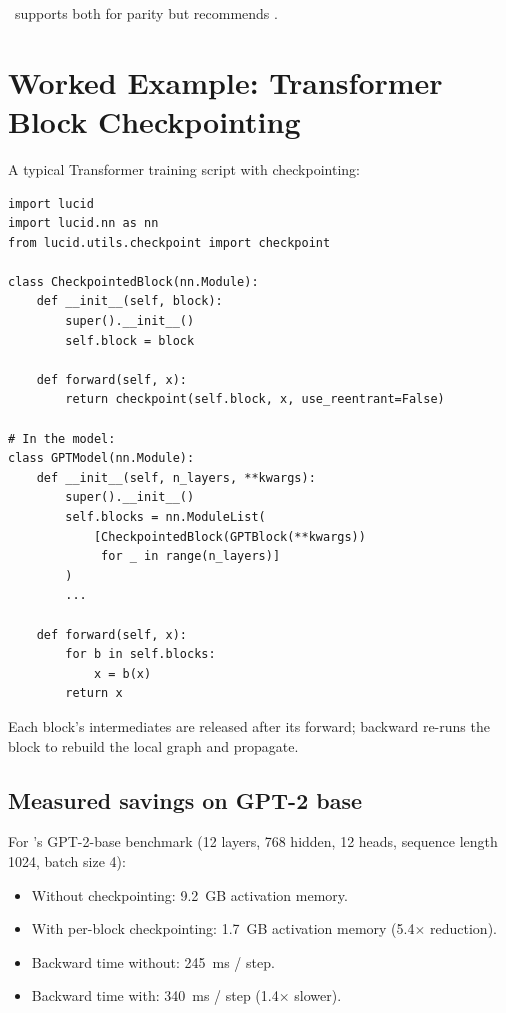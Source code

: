 \Lucid\ supports both for parity but recommends
.

\section{Worked Example: Transformer Block Checkpointing}
\label{sec:gradient_checkpointing:transformer_example}

A typical Transformer training script with checkpointing:

\begin{lstlisting}[style=lucid,language=LucidPython]
import lucid
import lucid.nn as nn
from lucid.utils.checkpoint import checkpoint

class CheckpointedBlock(nn.Module):
    def __init__(self, block):
        super().__init__()
        self.block = block

    def forward(self, x):
        return checkpoint(self.block, x, use_reentrant=False)

# In the model:
class GPTModel(nn.Module):
    def __init__(self, n_layers, **kwargs):
        super().__init__()
        self.blocks = nn.ModuleList(
            [CheckpointedBlock(GPTBlock(**kwargs))
             for _ in range(n_layers)]
        )
        ...

    def forward(self, x):
        for b in self.blocks:
            x = b(x)
        return x
\end{lstlisting}

Each block's intermediates are released after its forward;
backward re-runs the block to rebuild the local graph and
propagate.

\subsection{Measured savings on GPT-2 base}
\label{ssec:gradient_checkpointing:measured}

For \Lucid's GPT-2-base benchmark (12 layers, 768 hidden, 12
heads, sequence length 1024, batch size 4):

\begin{itemize}
  \item Without checkpointing: 9.2~GB activation memory.
  \item With per-block checkpointing: 1.7~GB activation memory
    (5.4$\times$ reduction).
  \item Backward time without: 245~ms / step.
  \item Backward time with: 340~ms / step (1.4$\times$ slower).
\end{itemize}

